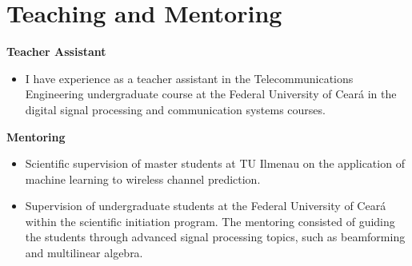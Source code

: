 \section{Teaching and Mentoring}

{\bf Teacher Assistant}\\
\begin{itemize}
	\item[] I have experience as a teacher assistant in the Telecommunications Engineering undergraduate course at the Federal University of Cear\'a in the digital signal processing and communication systems courses.
\end{itemize}

\newpage
{\bf Mentoring}\\
\begin{itemize}
	\item[] Scientific supervision of master students at TU Ilmenau on the application of machine learning to wireless channel prediction.
	\item[] Supervision of undergraduate students at the Federal University of Cear\'a within the scientific initiation program. The mentoring consisted of guiding the students through advanced signal processing topics, such as beamforming and multilinear algebra.
\end{itemize}
